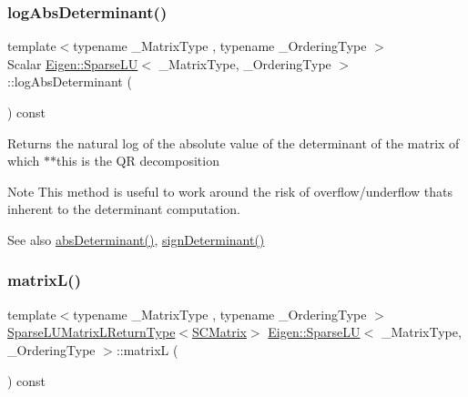 \subsubsection{\texorpdfstring{logAbsDeterminant()}{logAbsDeterminant()}}
{\footnotesize\ttfamily template$<$typename \+\_\+\+Matrix\+Type , typename \+\_\+\+Ordering\+Type $>$ \\
Scalar \mbox{\hyperlink{class_eigen_1_1_sparse_l_u}{Eigen\+::\+Sparse\+LU}}$<$ \+\_\+\+Matrix\+Type, \+\_\+\+Ordering\+Type $>$\+::log\+Abs\+Determinant (\begin{DoxyParamCaption}{ }\end{DoxyParamCaption}) const\hspace{0.3cm}{\ttfamily [inline]}}

\begin{DoxyReturn}{Returns}
the natural log of the absolute value of the determinant of the matrix of which $\ast$$\ast$this is the QR decomposition
\end{DoxyReturn}
\begin{DoxyNote}{Note}
This method is useful to work around the risk of overflow/underflow that\textquotesingle{}s inherent to the determinant computation.
\end{DoxyNote}
\begin{DoxySeeAlso}{See also}
\mbox{\hyperlink{class_eigen_1_1_sparse_l_u_a06fa89424239fb169d408f08252426d0}{abs\+Determinant()}}, \mbox{\hyperlink{class_eigen_1_1_sparse_l_u_a6651143e3b18fa90cfb3808b6fd23c4e}{sign\+Determinant()}} 
\end{DoxySeeAlso}
\mbox{\label{class_eigen_1_1_sparse_l_u_a634abe55e5a076f2e10db78871105a8f}} 
\subsubsection{\texorpdfstring{matrixL()}{matrixL()}}
{\footnotesize\ttfamily template$<$typename \+\_\+\+Matrix\+Type , typename \+\_\+\+Ordering\+Type $>$ \\
\mbox{\hyperlink{struct_eigen_1_1_sparse_l_u_matrix_l_return_type}{Sparse\+L\+U\+Matrix\+L\+Return\+Type}}$<$\mbox{\hyperlink{class_eigen_1_1internal_1_1_mapped_super_nodal_matrix}{S\+C\+Matrix}}$>$ \mbox{\hyperlink{class_eigen_1_1_sparse_l_u}{Eigen\+::\+Sparse\+LU}}$<$ \+\_\+\+Matrix\+Type, \+\_\+\+Ordering\+Type $>$\+::matrixL (\begin{DoxyParamCaption}{ }\end{DoxyParamCaption}) const\hspace{0.3cm}{\ttfamily [inline]}}

